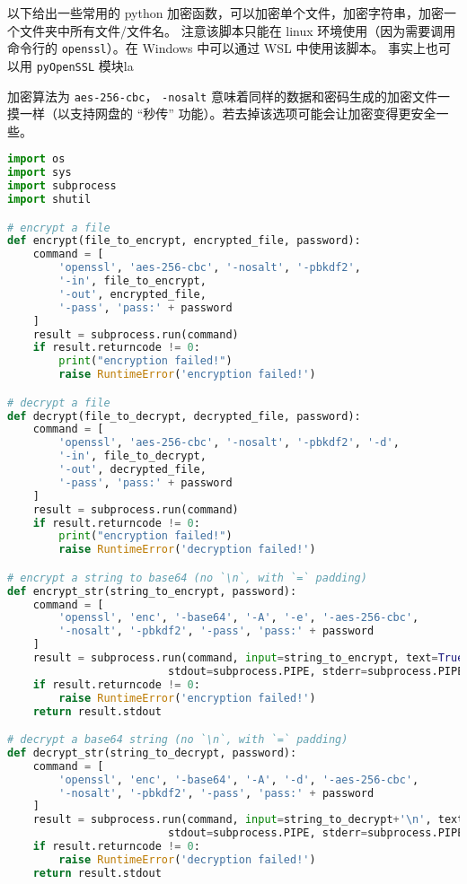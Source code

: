 

以下给出一些常用的 python 加密函数，可以加密单个文件，加密字符串，加密一个文件夹中所有文件/文件名。 注意该脚本只能在 linux 环境使用（因为需要调用命令行的 \verb`openssl`）。在 Windows 中可以通过 WSL 中使用该脚本。 事实上也可以用 \verb|pyOpenSSL| 模块la

加密算法为 \verb`aes-256-cbc`， \verb`-nosalt` 意味着同样的数据和密码生成的加密文件一摸一样（以支持网盘的 “秒传” 功能）。若去掉该选项可能会让加密变得更安全一些。

\begin{lstlisting}[language=python,caption=encrypt.py]
import os
import sys
import subprocess
import shutil

# encrypt a file
def encrypt(file_to_encrypt, encrypted_file, password):
	command = [
		'openssl', 'aes-256-cbc', '-nosalt', '-pbkdf2',
		'-in', file_to_encrypt,
		'-out', encrypted_file,
		'-pass', 'pass:' + password
	]
	result = subprocess.run(command)
	if result.returncode != 0:
		print("encryption failed!")
		raise RuntimeError('encryption failed!')

# decrypt a file
def decrypt(file_to_decrypt, decrypted_file, password):
	command = [
		'openssl', 'aes-256-cbc', '-nosalt', '-pbkdf2', '-d',
		'-in', file_to_decrypt,
		'-out', decrypted_file,
		'-pass', 'pass:' + password
	]
	result = subprocess.run(command)
	if result.returncode != 0:
		print("encryption failed!")
		raise RuntimeError('decryption failed!')

# encrypt a string to base64 (no `\n`, with `=` padding)
def encrypt_str(string_to_encrypt, password):
	command = [
		'openssl', 'enc', '-base64', '-A', '-e', '-aes-256-cbc',
		'-nosalt', '-pbkdf2', '-pass', 'pass:' + password
	]
	result = subprocess.run(command, input=string_to_encrypt, text=True,
						 stdout=subprocess.PIPE, stderr=subprocess.PIPE)
	if result.returncode != 0:
		raise RuntimeError('encryption failed!')
	return result.stdout

# decrypt a base64 string (no `\n`, with `=` padding)
def decrypt_str(string_to_decrypt, password):
	command = [
		'openssl', 'enc', '-base64', '-A', '-d', '-aes-256-cbc',
		'-nosalt', '-pbkdf2', '-pass', 'pass:' + password
	]
	result = subprocess.run(command, input=string_to_decrypt+'\n', text=True,
						 stdout=subprocess.PIPE, stderr=subprocess.PIPE)
	if result.returncode != 0:
		raise RuntimeError('decryption failed!')
	return result.stdout


\end{lstlisting}
